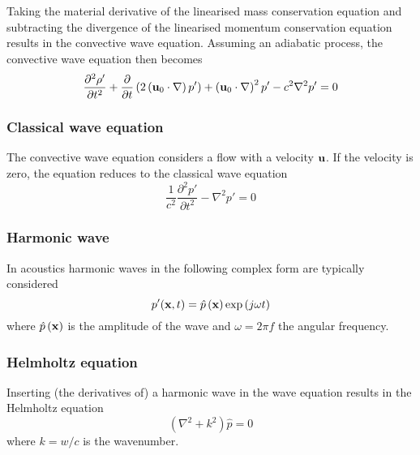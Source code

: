 Taking the material derivative of the linearised mass conservation equation and
subtracting the divergence of the linearised momentum conservation equation
results in the convective wave equation.
Assuming an adiabatic process, the convective wave equation then becomes
\begin{equation}
  \frac{\partial^2 \rho'}{\partial t^2} + \frac{\partial}{\partial t} \left( 2 \left( \mathbf{u}_0 \cdot \nabla \right) p' \right) + \left( \mathbf{u}_0 \cdot \nabla \right)^2 p' - c^2 \nabla^2 p' = 0
\end{equation}

\subsubsection*{Classical wave equation}
The convective wave equation considers a flow with a velocity $\mathbf{u}$. If the velocity is zero, the equation reduces to the classical wave equation
\begin{equation}\label{eq:theory:sound:wave:classic}
 \frac{1}{c^2} \frac{\partial^2 p'}{\partial t^2} - \nabla^2 p' = 0
\end{equation}

\subsubsection*{Harmonic wave}
In acoustics harmonic waves in the following complex form are typically considered
\begin{equation}
  p' (\mathbf{x}, t) = \hat{p} \left(\mathbf{x}\right) \exp{\left(j \omega t \right)}
\end{equation}
where $\hat{p} \left(\mathbf{x}\right)$ is the amplitude of the wave and $\omega=2 \pi f$ the angular frequency.

\subsubsection*{Helmholtz equation}
Inserting (the derivatives of) a harmonic wave in the wave equation results in
the Helmholtz equation
\begin{equation}\label{eq:theory:sound:wave:helmholtz}
 \left( \nabla^2 + k^2 \right) \hat{p} = 0
\end{equation}
where $k=w/c$ is the wavenumber.

